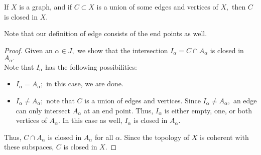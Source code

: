 \documentclass[12pt]{article}
\begin{document}
\begin{lem} \label{lem:edgesverticesclosed}
	If $X$ is a graph, and if $C \subset X$ is a union of some edges and vertices of $X,$ then $C$ is closed in $X.$
\end{lem}
Note that our definition of edge consists of the end points as well.
\begin{proof} 
	Given an $\alpha \in J,$ we show that the intersection $I_\alpha = C\cap A_\alpha$ is closed in $A_\alpha.$\\
	Note that $I_\alpha$ has the following possibilities:
	\begin{itemize}
		\item $I_\alpha = A_\alpha;$ in this case, we are done.
		\item $I_\alpha \neq A_\alpha;$ note that $C$ is a union of edges and vertices. Since $I_\alpha \neq A_\alpha,$ an edge can only intersect $A_\alpha$ at an end point. Thus, $I_\alpha$ is either empty, one, or both vertices of $A_\alpha.$ In this case as well, $I_\alpha$ is closed in $A_\alpha.$
	\end{itemize}
	Thus, $C \cap A_\alpha$ is closed in $A_\alpha$ for all $\alpha.$ Since the topology of $X$ is coherent with these subspaces, $C$ is closed in $X.$	
\end{proof}
\end{document}
